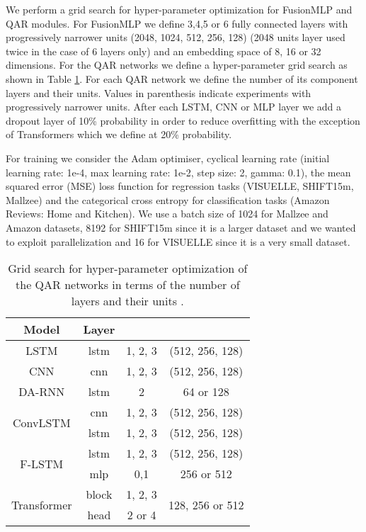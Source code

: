 \documentclass{article}
\begin{document}
We perform a grid search for hyper-parameter optimization for FusionMLP and QAR modules.
For FusionMLP we define 3,4,5 or 6 fully connected layers with progressively narrower units  (2048, 1024, 512, 256, 128) (2048 units layer used twice in the case of 6 layers only) and an embedding space of 8, 16 or 32 dimensions. 
For the QAR networks we define a hyper-parameter grid search as shown in Table \ref{tab:gridsearch}. For each QAR network we define the number of its component layers and their units. Values in parenthesis indicate experiments with progressively narrower units. 
After each LSTM, CNN or MLP layer we add a dropout layer of 10\% probability in order to reduce overfitting with the exception of Transformers which we define at 20\% probability.

For training we consider the Adam optimiser, cyclical learning rate \cite{smith2017cyclical} (initial learning rate: 1e-4, max learning rate: 1e-2, step size: 2, gamma: 0.1), the mean squared error (MSE) loss function for regression tasks (VISUELLE, SHIFT15m, Mallzee) and the categorical cross entropy for classification tasks (Amazon Reviews: Home and Kitchen).
We use a batch size of 1024 for Mallzee and Amazon datasets, 8192 for SHIFT15m since it is a larger dataset and we wanted to exploit parallelization and 16 for VISUELLE since it is a very small dataset.

\begin{table}
\centering
  \caption{Grid search for hyper-parameter optimization of the QAR networks in terms of the number of layers  and their units .}
  \label{tab:gridsearch}
  \begin{tabular}{c|c|c|c}
    \toprule
     \multicolumn{1}{c}{Model} & 
     \multicolumn{1}{c}{Layer} & 
     \multicolumn{1}{c}{} & 
     \multicolumn{1}{c}{}
     \\
     \midrule
     
     LSTM & lstm & 1, 2, 3 & (512, 256, 128) \\
     \midrule
     CNN & cnn & 1, 2, 3 & (512, 256, 128) \\
     \midrule
     
     DA-RNN & lstm & 2 & 64 or 128 \\
     \midrule
     
      \multirow{2}{*}{ConvLSTM} & cnn & 1, 2, 3 & (512, 256, 128) \\
      & lstm & 1, 2, 3 & (512, 256, 128) \\
    \midrule
    
    \multirow{2}{*}{F-LSTM} & lstm & 1, 2, 3 & (512, 256, 128) \\
    & mlp & 0,1 & 256 or 512 \\
     \midrule
     
    \multirow{2}{*}{Transformer} & block & 1, 2, 3 & \multirow{2}{*}{128, 256 or 512} \\
    & head & 2 or 4 &  \\
    
    
     
    \bottomrule
  \end{tabular}
  
\end{table}
\end{document}
